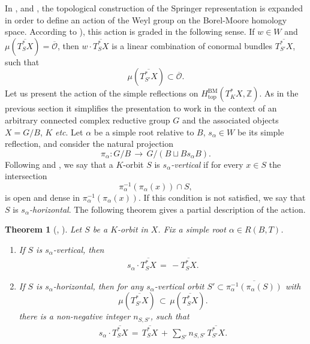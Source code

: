 \documentclass[a4paper, 11pt]{article}
\newtheorem{theo}{Theorem}[section]
\begin{document}
In \cite{Hotta85}, \cite{HottaR} and \cite{Rossmann95}, the
topological construction of the Springer representation 
is expanded in order to define an action of the Weyl group
on the Borel-Moore homology space. 
According to \cite[{Lemma 1 \S3 and Theorem \S4}]{Hotta85}),
this action is graded in the following sense.  If $w \in W$ and 
$\mu\left(\overline{T_S^{\ast}X}\right)=\overline{\mathcal{O}}$,
then $w\cdot \overline{T_S^{\ast}X}$
is a linear combination of conormal bundles 
$\overline{T_{S'}^{\ast}X}$, such that
$$
\mu\left(\overline{T_{S'}^{\ast}X}\right)\subset\overline{\mathcal{O}}.
$$
Let us present the action
of the simple reflections on $H_{\mathrm{top}}^{\mathrm{BM}}
(T_K^{\ast}X, \mathbb{Z})$. As in the previous section it simplifies the 
presentation to work in the context of an arbitrary connected complex
reductive group $G$ and the associated objects $X = G/B$, $K$ \emph{etc}.
Let $\alpha$ be a simple root relative to $B$, $s_{\alpha} \in W$ be its simple
reflection, and consider the natural projection 
\begin{equation}
\label{pimap}
\pi_{\alpha}: G/ B\,
\longrightarrow\, G/(B\sqcup B s_\alpha B).
\end{equation}
Following \cite[Section 2]{Hotta85} and \cite[{\S3, Lemma
    2}]{Tanisaki}, we say that a  
$K$-orbit $S$ is \emph{$s_\alpha$-vertical} if  for every $ x \in S$
the intersection 
$$
\pi_\alpha^{-1}(\pi_\alpha(x)) \cap S,
$$
is open and dense in $\pi_\alpha^{-1}(\pi_\alpha(x))$. If this
condition is not satisfied, we say 
that $S$ is \emph{$s_\alpha$-horizontal}. 
The following theorem gives a partial description of the action. 
\begin{theo}[{\cite[Sections 3 and 4]{Hotta85}}, {\cite[Proposition
        8]{Tanisaki}}] 
\label{theo:Waction} Let $S$ be a $K$-orbit in $X$. Fix a simple root
$\alpha \in R(B,T)$. 
\begin{enumerate}
\item 
If $S$ is $s_\alpha$-{\it{vertical}}, then
\begin{align}\label{eq:vertical}
s_\alpha\cdot \overline{T_S^{\ast}X}\, =\, -{\overline{T_S^{\ast}X}}. 
\end{align}
\item\label{theo:Waction2}  If $S$ is $s_\alpha$-{\it{horizontal}}, then
for any $s_\alpha$-vertical orbit
$S'\subset\overline{\pi_{\alpha}^{-1}(\pi_{\alpha}(S))}$  
with
$$
\mu\left(\overline{T^{\ast}_{S'}X}\right)\, \subset\, 
\mu\left(\overline{T^{\ast}_{S}X}\right).
$$
there is a non-negative integer $n_{S, S'}$, such that
\begin{align}\label{eq:horizontal}
s_{\alpha} \cdot \overline{T^{*}_{S}X}\, =\, \overline{T^{*}_{S}X}\, +\, 
\sum_{S'}n_{S,S'} \, \overline{T^{*}_{S'}X}.
\end{align}
\end{enumerate}
\end{theo}
\end{document}
